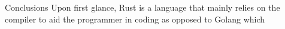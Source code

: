 Conclusions
Upon first glance, Rust is a language that mainly relies on the compiler to aid the programmer in coding as opposed to Golang which 

